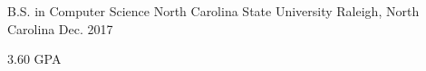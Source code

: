 
\begin{cventries}
	
	\cventry
		{B.S. in Computer Science}
		{North Carolina State University}
		{Raleigh, North Carolina}
		{Dec. 2017}
		{
			\begin{cvitems}
				\item {3.60 GPA}
			\end{cvitems}
		}
	
\end{cventries}
